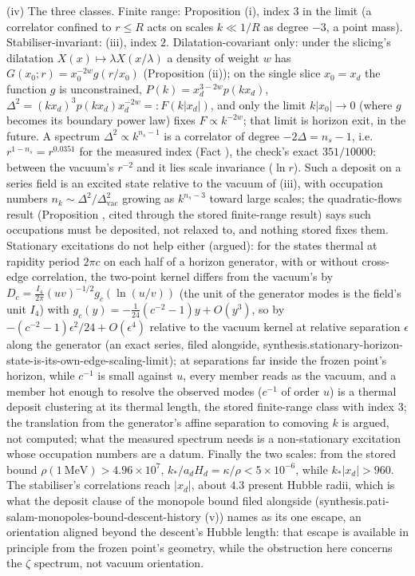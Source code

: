 (iv) The three classes. Finite range: Proposition (i), index $3$ in the limit (a correlator confined to $r \le R$ acts on scales $k \ll 1/R$ as degree $-3$, a point mass). Stabiliser-invariant: (iii), index $2$. Dilatation-covariant only: under the slicing's dilatation $X(x) \mapsto \lambda X(x/\lambda)$ a density of weight $w$ has $G(x_{0}; r) = x_{0}^{-2w}g(r/x_{0})$ (Proposition (ii)); on the single slice $x_{0} = x_{d}$ the function $g$ is unconstrained, $P(k) = x_{d}^{3 - 2w}p(kx_{d})$, $\Delta^{2} = (kx_{d})^{3}p(kx_{d})x_{d}^{-2w} =: F(k|x_{d}|)$, and only the limit $k|x_{0}| \to 0$ (where $g$ becomes its boundary power law) fixes $F \propto k^{-2w}$; that limit is horizon exit, in the future. A spectrum $\Delta^{2} \propto k^{n_{s} - 1}$ is a correlator of degree $-2\Delta = n_{s} - 1$, i.e. $r^{1 - n_{s}} = r^{0.0351}$ for the measured index (Fact ), the check's exact $351/10000$: between the vacuum's $r^{-2}$ and it lies scale invariance ($\ln r$). Such a deposit on a series field is an excited state relative to the vacuum of (iii), with occupation numbers $n_{k} \sim \Delta^{2}/\Delta^{2}_{\mathrm{vac}}$ growing as $k^{n_{s} - 3}$ toward large scales; the quadratic-flows result (Proposition , cited through the stored finite-range result) says such occupations must be deposited, not relaxed to, and nothing stored fixes them. Stationary excitations do not help either (argued): for the states thermal at rapidity period $2\pi c$ on each half of a horizon generator, with or without cross-edge correlation, the two-point kernel differs from the vacuum's by $D_{c} = \tfrac{I_4}{2\pi}(uv)^{-1/2}g_{c}(\ln(u/v))$ (the unit of the generator modes is the field's unit $I_4$) with $g_{c}(y) = -\tfrac{1}{24}(c^{-2} - 1)y + O(y^{3})$, so by $-(c^{-2} - 1)\epsilon^{2}/24 + O(\epsilon^{4})$ relative to the vacuum kernel at relative separation $\epsilon$ along the generator (an exact series, filed alongside, synthesis.stationary-horizon-state-is-its-own-edge-scaling-limit); at separations far inside the frozen point's horizon, while $c^{-1}$ is small against $u$, every member reads as the vacuum, and a member hot enough to resolve the observed modes ($c^{-1}$ of order $u$) is a thermal deposit clustering at its thermal length, the stored finite-range class with index $3$; the translation from the generator's affine separation to comoving $k$ is argued, not computed; what the measured spectrum needs is a non-stationary excitation whose occupation numbers are a datum. Finally the two scales: from the stored bound $\rho(1\ \mathrm{MeV}) > 4.96 \times 10^{7}$, $k_{*}/a_{d}H_{d} = \kappa/\rho < 5 \times 10^{-6}$, while $k_{*}|x_{d}| > 960$. The stabiliser's correlations reach $|x_{d}|$, about $4.3$ present Hubble radii, which is what the deposit clause of the monopole bound filed alongside (synthesis.pati-salam-monopoles-bound-descent-history (v)) names as its one escape, an orientation aligned beyond the descent's Hubble length: that escape is available in principle from the frozen point's geometry, while the obstruction here concerns the $\zeta$ spectrum, not vacuum orientation.
